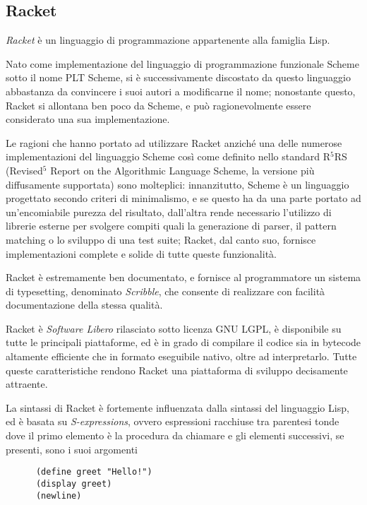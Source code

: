 \subsection{Racket}

\emph{Racket} \`e un linguaggio di programmazione appartenente alla
famiglia Lisp.

Nato come implementazione del linguaggio di programmazione funzionale Scheme
sotto il nome PLT Scheme, si \`e successivamente discostato da questo
linguaggio abbastanza da convincere i suoi autori a modificarne il nome;
nonostante questo, Racket si allontana ben poco da Scheme, e pu\`o
ragionevolmente essere considerato una sua implementazione.

Le ragioni che hanno portato ad utilizzare Racket anzich\'e una delle
numerose implementazioni del linguaggio Scheme cos\`i come definito nello
standard R$^{5}$RS (Revised$^{5}$ Report on the Algorithmic Language
Scheme\cite{r5rs}, la versione pi\`u diffusamente supportata) sono
molteplici: innanzitutto, Scheme \`e un linguaggio progettato secondo
criteri di minimalismo, e se questo ha da una parte portato ad
un'encomiabile purezza del risultato, dall'altra rende necessario
l'utilizzo di librerie esterne per svolgere compiti quali la generazione di
parser, il pattern matching o lo sviluppo di una test suite; Racket, dal
canto suo, fornisce implementazioni complete e solide di tutte queste
funzionalit\`a.

Racket \`e estremamente ben documentato, e fornisce al programmatore un
sistema di typesetting, denominato \emph{Scribble}, che consente di
realizzare con facilit\`a documentazione della stessa qualit\`a.

Racket \`e \emph{Software Libero} rilasciato sotto licenza GNU LGPL, \`e
disponibile su tutte le principali piattaforme, ed \`e in grado di compilare
il codice sia in bytecode altamente efficiente che in formato eseguibile
nativo, oltre ad interpretarlo. Tutte queste caratteristiche rendono Racket
una piattaforma di sviluppo decisamente attraente.

La sintassi di Racket \`e fortemente influenzata dalla sintassi del
linguaggio Lisp, ed \`e basata su \emph{S-expressions}, ovvero espressioni
racchiuse tra parentesi tonde dove il primo elemento \`e la procedura
da chiamare e gli elementi successivi, se presenti, sono i suoi argomenti

\begin{lstlisting}
      (define greet "Hello!")
      (display greet)
      (newline)
\end{lstlisting}

